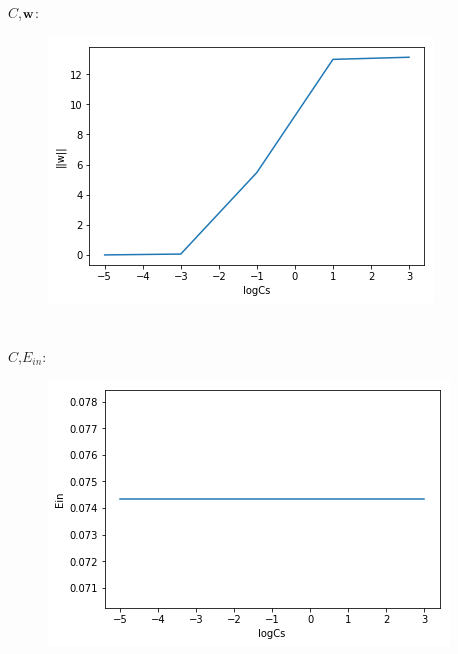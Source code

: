 \documentclass[fleqn,a4paper,12pt]{article}
\begin{document}
\section{} %
{\McQ{}}$C${\MbQ{}},$\bold w${\MbQ{}}:
\begin{figure}[h]
\centering
\includegraphics[scale=0.9]{Q11.png}
\end{figure}

\section{} %
{\McQ{}}$C${\MbQ{}},$E_{in}${\McQ{}}:
\begin{figure}[h]
\centering
\includegraphics[scale=0.9]{Q12.png}
\end{figure}
\end{document}
